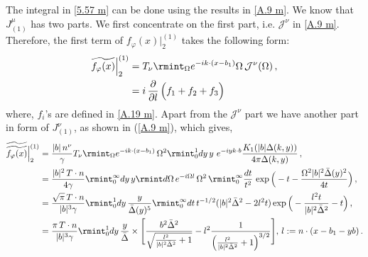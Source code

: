 The integral in \eqref{5.57 m} can be done using the results in \eqref{A.9 m}. We know that $J_{(1)}^{\mu}$ has two parts. We first concentrate on the first part, i.e. $\mathcal{J}^{\nu}$ in \eqref{A.9 m}. Therefore, the first term of $f_{\varphi}(x)\Big|^{(1)}_{2}$ takes the following form:
\begin{align}
    \begin{split} \label{ex}
        \widetilde {f_{\varphi}(x)}\Big|_{2}^{(1)}&=T_{\nu}\rmint_{\Omega}e^{-ik\cdot (x-b_1)}\Omega\,\mathcal{J}^{\nu}(\Omega)\,,\\ &
        =i\,\frac{\partial}{\partial l}\,\Big(f_1+f_2+f_3\Big)
    \end{split}
\end{align}
where, $f_i$'s are defined in \eqref{A.19 m}. Apart from the $\mathcal{J}^{\nu}$ part we have another part in form of $J_{(1)}^\nu$, as shown in (\ref{A.9 m}), which gives,
\begin{align}
    \begin{split} \label{ex1}
      \widetilde{ \widetilde{f_{\varphi}(x)}}\Big|_{2}^{(1)}&= \frac{|b| \,n^\nu}{\gamma}T_{\nu}\rmint_{\Omega}e^{-ik\cdot (x-b_1)}\,\Omega^2 \rmint_{0}^1dy\,y\,\,e^{-iyk\cdot b}\frac{K_1(|b|\Delta(k,y))}{4\pi\Delta(k,y)}\,, \\ &
       =\frac{|b|^2 \,T\cdot n}{4\gamma}\rmint_0^\infty dy\,y\rmint d\Omega\, e^{-i\Omega l}\,\Omega^2\, \rmint_{0}
^\infty \frac{dt}{t^2}\,\exp\Big(-t-\frac{\Omega^2|b|^2\bar\Delta(y)^2}{4t}\Big)\,,\\ &
=\frac{\sqrt{\pi} \,T\cdot n}{|b|^3\gamma}\rmint_{0}^1dy\,\frac{y}{\bar\Delta(y)^5}\rmint_0^\infty dt\,t^{-1/2}(|b|^2\bar\Delta^2-2l^2t)\exp\Big(-\frac{l^2 t}{|b|^2\bar\Delta^2}-t\Big)\,,\\ &
=\frac{{\pi} \,T\cdot n}{|b|^3\gamma}\rmint_0^1 dy\,\frac{y}{\Bar \Delta}\times \Bigg[\frac{b^2\Bar\Delta^2}{\sqrt{\frac{l^2}{|b|^2 \Bar\Delta ^2}+1}}-l^2\frac{1}{ \left(\frac{l^2}{|b|^2 \Bar\Delta ^2}+1\right)^{3/2}}\Bigg],\,l:=n\cdot (x-b_1-yb)\,.
\end{split}
\end{align}

